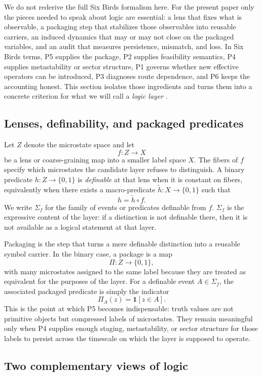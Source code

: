 \documentclass[11pt]{article}
\theoremstyle{definition}
\begin{document}
We do not rederive the full Six Birds formalism here. For the present paper only the pieces needed to speak about logic are essential: a lens that fixes what is observable, a packaging step that stabilizes those observables into reusable carriers, an induced dynamics that may or may not close on the packaged variables, and an audit that measures persistence, mismatch, and loss. In Six Birds terms, P5 supplies the package, P2 supplies feasibility semantics, P4 supplies metastability or sector structure, P1 governs whether new effective operators can be introduced, P3 diagnoses route dependence, and P6 keeps the accounting honest. This section isolates those ingredients and turns them into a concrete criterion for what we will call a \emph{logic layer} \cite{tsiokos2026sixbirds}.

\subsection{Lenses, definability, and packaged predicates}

Let \(Z\) denote the microstate space and let
\[
f: Z \to X
\]
be a lens or coarse-graining map into a smaller label space \(X\). The fibers of \(f\) specify which microstates the candidate layer refuses to distinguish. A binary predicate \(h: Z \to \{0,1\}\) is \emph{definable} at that lens when it is constant on fibers, equivalently when there exists a macro-predicate \(\tilde h : X \to \{0,1\}\) such that
\[
h = \tilde h \circ f.
\]
We write \(\Sigma_f\) for the family of events or predicates definable from \(f\). \(\Sigma_f\) is the expressive content of the layer: if a distinction is not definable there, then it is not available as a logical statement at that layer.

Packaging is the step that turns a mere definable distinction into a reusable symbol carrier. In the binary case, a package is a map
\[
\Pi : Z \to \{0,1\},
\]
with many microstates assigned to the same label because they are treated as equivalent for the purposes of the layer. For a definable event \(A \in \Sigma_f\), the associated packaged predicate is simply the indicator
\[
\Pi_A(z) = \mathbf{1}[z \in A].
\]
This is the point at which P5 becomes indispensable: truth values are not primitive objects but compressed labels of microstates. They remain meaningful only when P4 supplies enough staging, metastability, or sector structure for those labels to persist across the timescale on which the layer is supposed to operate.

\subsection{Two complementary views of logic}
\end{document}

